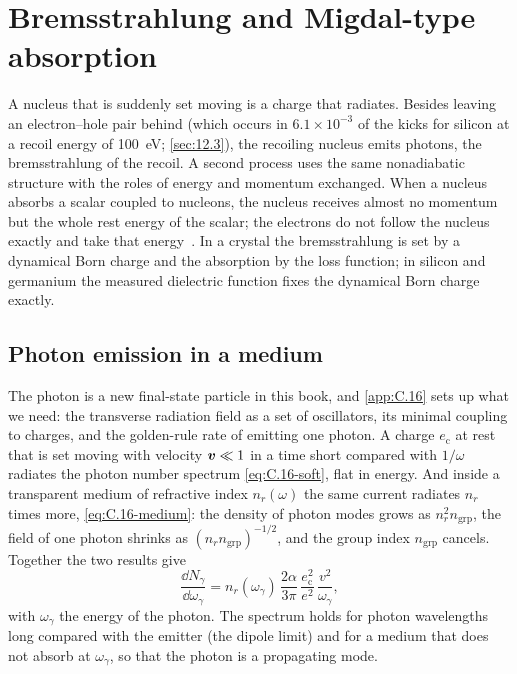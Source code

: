 \section{Bremsstrahlung and Migdal-type absorption}\label{sec:12.6}

A nucleus that is suddenly set moving is a charge that radiates. Besides leaving an electron--hole pair behind (which occurs in $6.1\times10^{-3}$ of the kicks for silicon at a recoil energy of \SI{100}{eV}; \cref{sec:12.3}), the recoiling nucleus emits photons, the bremsstrahlung of the recoil. A second process uses the same nonadiabatic structure with the roles of energy and momentum exchanged. When a nucleus absorbs a scalar coupled to nucleons, the nucleus receives almost no momentum but the whole rest energy of the scalar; the electrons do not follow the nucleus exactly and take that energy~\cite{dzuba2024migdal}. In a crystal the bremsstrahlung is set by a dynamical Born charge and the absorption by the loss function; in silicon and germanium the measured dielectric function fixes the dynamical Born charge exactly.

\subsection{Photon emission in a medium}\label{sec:12.6-photon}

The photon is a new final-state particle in this book, and \cref{app:C.16} sets up what we need: the transverse radiation field as a set of oscillators, its minimal coupling to charges, and the golden-rule rate of emitting one photon. A charge $e_{\mathrm{c}}$ at rest that is set moving with velocity $\bm{v} \ll 1$ in a time short compared with $1/\omega$ radiates the photon number spectrum \cref{eq:C.16-soft}, flat in energy. And inside a transparent medium of refractive index $n_r(\omega)$ the same current radiates $n_r$ times more, \cref{eq:C.16-medium}: the density of photon modes grows as $n_r^2n_{\mathrm{grp}}$, the field of one photon shrinks as $(n_rn_{\mathrm{grp}})^{-1/2}$, and the group index $n_{\mathrm{grp}}$ cancels. Together the two results give
\begin{equation}
  \frac{\dd N_\gamma}{\dd\omega_\gamma} = n_r(\omega_\gamma)\,\frac{2\alpha}{3\pi}\,\frac{e_{\mathrm{c}}^2}{e^2}\,\frac{v^2}{\omega_\gamma} ,
  \label{eq:12.6-classical}
\end{equation}
with $\omega_\gamma$ the energy of the photon. The spectrum holds for photon wavelengths long compared with the emitter (the dipole limit) and for a medium that does not absorb at $\omega_\gamma$, so that the photon is a propagating mode.

